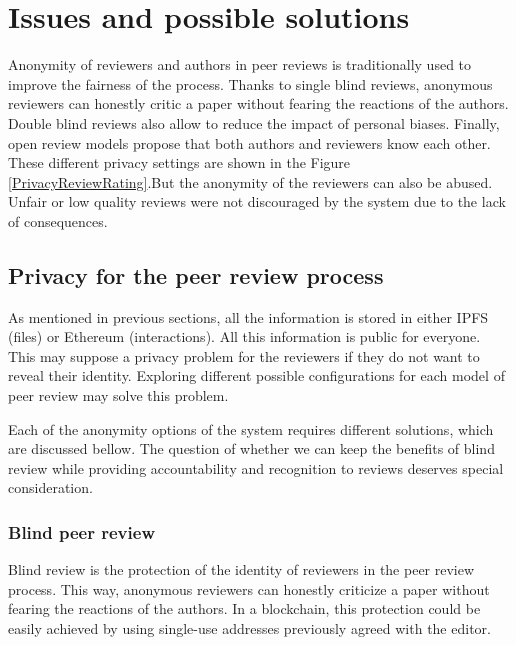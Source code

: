 \section{Issues and possible solutions}
\label{sec:privacyReview}


Anonymity of reviewers and authors in peer reviews is traditionally used to
improve the fairness of the process. Thanks to single blind reviews, anonymous
reviewers can honestly critic a paper without fearing the reactions of the
authors. Double blind reviews also allow to reduce the impact of personal
biases. Finally, open review models propose that both authors and reviewers know
each other. These different privacy settings are shown in the Figure
\ref{PrivacyReviewRating}.But the anonymity of the reviewers can also be abused.
Unfair or low quality reviews were not discouraged by the system due to the lack
of consequences.

\subsection{Privacy for the peer review process}
\label{sec:privacy-peer-review}

As mentioned in previous sections, all the information is stored in either IPFS
(files) or Ethereum (interactions). All this information is public for everyone.
This may suppose a privacy problem for the reviewers if they do not want to
reveal their identity. Exploring different possible configurations for each model of
peer review may solve this problem.

Each of the anonymity options of the system requires different solutions, which
are discussed bellow. The question of whether we can keep the benefits of blind
review while providing accountability and recognition to reviews deserves
special consideration.

\subsubsection*{Blind peer review}
Blind review is the protection of the identity of reviewers in the peer review
process. This way, anonymous reviewers can honestly criticize a paper without
fearing the reactions of the authors. In a blockchain, this protection could be
easily achieved by using single-use addresses previously agreed with the editor.

